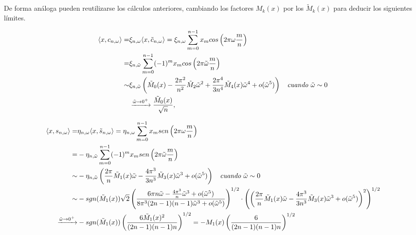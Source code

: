 De forma análoga pueden reutilizarse los cálculos anteriores,
cambiando los factores $M_{k}(x)$ por los $\tilde{M}_{k}(x)$
para deducir los siguientes límites.


\begin{align*}
\langle x,
c_{n, \omega}
\rangle = & 
\xi_{n, \omega} \langle x,
\tilde{c}_{n, \omega}
\rangle =  
\xi_{n, \omega} \sum\limits_{m=0}^{n-1}x_{m} cos \left(
2 \pi \omega \frac{m}{n}
\right)
\\
= &  
\xi_{n, \tilde{\omega}} \sum\limits_{m=0}^{n-1}(-1)^{m}x_{m} cos \left(
2 \pi \tilde{\omega} \frac{m}{n}
\right)\\
\sim &
\xi_{n, \tilde{\omega}} 
\left(
\tilde{M}_{0}(x) - \frac{2 \pi^{2}}{n^{2}}\tilde{M}_{2} \tilde{\omega}^{2} 
+ \frac{2 \pi^{4}}{3n^{4}} \tilde{M}_{4}(x) \tilde{\omega}^{4} + o(\tilde{\omega}^{5})
\right) 
\hspace{0.2cm} \textit{ cuando } \tilde{\omega} \sim 0
\\
& 
\xrightarrow{\tilde{\omega} \rightarrow 0^{+}}
\frac{\tilde{M}_{0}(x)}{\sqrt{n}},
\end{align*}

\begin{align*}
\langle x,
s_{n, \omega}
\rangle = &
\eta_{n, \omega}
\langle
x, \tilde{s}_{n, \omega}
\rangle
= \eta_{n, \omega}
\sum\limits_{m=0}^{n-1}
x_{m}sen\left(
2 \pi \omega\frac{m}{n}
\right)
 \\
= &
- \eta_{n, \tilde{\omega}}
\sum\limits_{m=0}^{n-1}
(-1)^{m}
x_{m}sen\left(
2 \pi \tilde{\omega} \frac{m}{n}
\right)
 \\
\sim &
-\eta_{n, \tilde{\omega}}
\left(
\frac{2\pi}{n} \tilde{M}_{1}(x)\tilde{\omega}
-\frac{4\pi^{3}}{3n^{3}} \tilde{M}_{3}(x)\tilde{\omega}^{3}
+ o(\tilde{\omega}^{5})
\right)
\hspace{0.2cm} \textit{ cuando } \tilde{\omega} \sim 0 \\
\sim &
- sgn(\tilde{M}_{1}(x))
\sqrt{2} 
\left(
\frac{
6 \pi n \tilde{\omega} -
\frac{4 \pi^{3}}{n} \tilde{\omega}^{3} + o(\tilde{\omega}^{5})
}{8 \pi^{3} (2n-1)(n-1)\tilde{\omega}^{3} + o(\tilde{\omega}^{5})
}
\right)^{1/2}
\cdot 
\left(
\left(
\frac{2 \pi}{n} \tilde{M}_{1}(x) \tilde{\omega} - \frac{4 \pi^{3}}{3n^{3}}
\tilde{M}_{3}(x) \tilde{\omega}^{3} 
 + o(\tilde{\omega}^{5})
\right)^{2}
\right)^{1/2}\\
\xrightarrow{\tilde{\omega} \rightarrow 0^{+}} & - 
sgn(\tilde{M}_{1}(x))
\left(
\frac{6 \tilde{M}_{1}(x)^{2}}{(2n-1)(n-1)n}
\right)^{1/2}
= -M_{1}(x)
\left(
\frac{6}{(2n-1)(n-1)n}
\right)^{1/2}
\end{align*}

